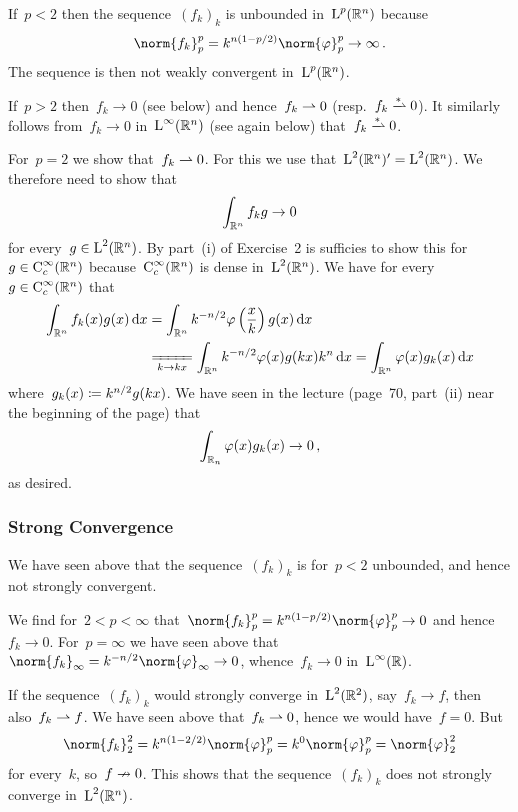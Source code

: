 If~$p < 2$ then the sequence~$(f_k)_k$ is unbounded in~$\operatorname{L}^p(\mathbb{R}^n)$ because
\[
  \norm{f_k}_p^p
  =
  k^{n(1-p/2)} \norm{\varphi}_p^p
  \to
  \infty \,.
\]
The sequence is then not weakly convergent in~$\operatorname{L}^p(\mathbb{R}^n)$.

If~$p > 2$ then~$f_k \to 0$ (see below) and hence~$f_k \rightharpoonup 0$ (resp.~$f_k \wtostar 0$).
It similarly follows from~$f_k \to 0$ in~$\operatorname{L}^\infty(\mathbb{R}^n)$ (see again below) that~$f_k \wtostar 0$.

For~$p = 2$ we show that~$f_k \rightharpoonup 0$.
For this we use that~$\operatorname{L}^2(\mathbb{R}^n)' = \operatorname{L}^2(\mathbb{R}^n)$.
We therefore need to show that
\[
      \int_{\mathbb{R}^n} f_k g
  \to 0
\]
for every~$g \in \operatorname{L}^2(\mathbb{R}^n)$.
By part~(i) of Exercise~2 is sufficies to show this for~$g \in \operatorname{C}^\infty_c(\mathbb{R}^n)$ because~$\operatorname{C}^\infty_c(\mathbb{R}^n)$ is dense in~$\operatorname{L}^2(\mathbb{R}^n)$.
We have for every~$g \in \operatorname{C}^\infty_c(\mathbb{R}^n)$ that
\begin{align*}
  \int_{\Real^n} f_k(x) g(x) \dd{x}
  &=
  \int_{\Real^n} k^{-n/2} \varphi\left( \frac{x}{k} \right) g(x) \dd{x} \\
  &\xlongequal[k \to kx]{}
  \int_{\Real^n} k^{-n/2} \varphi(x) g(kx) k^n \dd{x}
  =
  \int_{\Real^n} \varphi(x) g_k(x) \dd{x}
\end{align*}
where~$g_k(x) \coloneqq k^{n/2} g(kx)$.
We have seen in the lecture (page~70, part~(ii) near the beginning of the page) that
\[
      \int_{\mathbb{R}_n} \varphi(x) g_k(x)
  \to 0 \,,
\]
as desired.





\subsubsection{Strong Convergence}

We have seen above that the sequence~$(f_k)_k$ is for~$p < 2$ unbounded, and hence not strongly convergent.

We find for~$2 < p < \infty$ that~$\norm{f_k}_p^p = k^{n(1-p/2)} \norm{\varphi}_p^p \to 0$ and hence~$f_k \to 0$.
For~$p = \infty$ we have seen above that~$\norm{f_k}_\infty = k^{-n/2} \norm{\varphi}_\infty \to 0$, whence~$f_k \to 0$ in~$\operatorname{L}^\infty(\mathbb{R})$.

If the sequence~$(f_k)_k$ would strongly converge in~$\operatorname{L}^2(\mathbb{R}^2)$, say~$f_k \to f$, then also~$f_k \rightharpoonup f$.
We have seen above that~$f_k \rightharpoonup 0$, hence we would have~$f = 0$.
But
\[
    \norm{f_k}_2^2
  = k^{n(1-2/2)} \norm{\varphi}_p^p
  = k^0 \norm{\varphi}_p^p
  = \norm{\varphi}_2^2
\]
for every~$k$, so~$f \nrightarrow 0$.
This shows that the sequence~$(f_k)_k$ does not strongly converge in~$\operatorname{L}^2(\mathbb{R}^n)$.
















